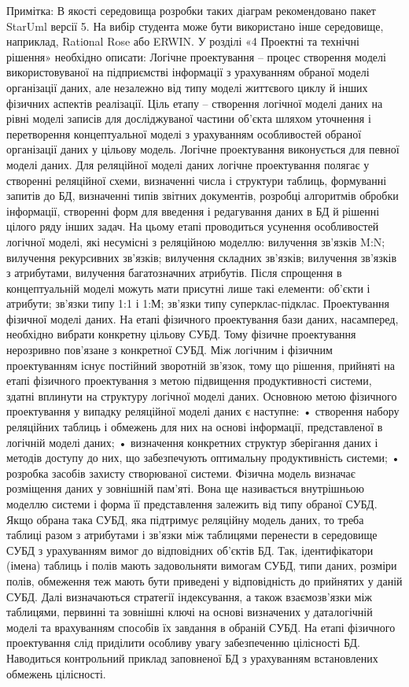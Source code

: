 Примітка: В якості середовища розробки таких діаграм рекомендовано пакет StarUml версії 5. На вибір студента може бути використано інше середовище, наприклад, Ratiоnal Rose або ERWIN.
 	У розділі «4  Проектні та технічні рішення» необхідно описати:
	Логічне проектування – процес створення моделі використовуваної на підприємстві інформації з урахуванням обраної моделі організації даних, але незалежно від типу моделі життєвого циклу й інших фізичних аспектів реалізації. Ціль етапу – створення логічної моделі даних на рівні моделі записів для досліджуваної частини об’єкта  шляхом уточнення і перетворення концептуальної моделі з урахуванням особливостей обраної організації даних у цільову модель. 
Логічне проектування виконується для певної моделі даних. Для реляційної моделі даних логічне проектування полягає у створенні реляційної схеми, визначенні числа і структури таблиць, формуванні запитів до БД, визначенні типів звітних документів, розробці алгоритмів обробки інформації, створенні форм для введення і редагування даних в БД й рішенні цілого ряду інших задач. На цьому етапі проводиться усунення особливостей логічної моделі, які несумісні з реляційною моделлю: вилучення зв’язків M:N; вилучення рекурсивних зв’язків; вилучення складних зв’язків; вилучення зв’язків з атрибутами, вилучення багатозначних атрибутів. Після спрощення в концептуальній моделі можуть мати присутні лише такі елементи: об’єкти і атрибути; зв’язки типу 1:1 і 1:М; зв’язки типу суперклас-підклас.
	Проектування фізичної моделі даних. На етапі фізичного проектування бази даних, насамперед, необхідно вибрати конкретну цільову СУБД. Тому фізичне проектування нерозривно пов'язане з конкретної СУБД. Між логічним і фізичним проектуванням існує постійний зворотній зв'язок, тому що рішення, прийняті на етапі фізичного проектування з метою підвищення продуктивності системи, здатні вплинути на структуру логічної моделі даних. 
	Основною метою фізичного проектування у випадку реляційної моделі даних є наступне: 
	• створення набору реляційних таблиць і обмежень для них на основі інформації, представленої в логічній моделі даних; 
	• визначення конкретних структур зберігання даних і методів доступу до них, що забезпечують оптимальну продуктивність системи; 
	• розробка засобів захисту створюваної системи. 
	Фізична модель визначає розміщення даних у зовнішній пам’яті. Вона ще називається внутрішньою моделлю системи і форма її представлення залежить від типу обраної СУБД. Якщо обрана така СУБД, яка підтримує реляційну модель даних, то треба таблиці разом з атрибутами і зв’язки між таблицями перенести в середовище СУБД з урахуванням вимог до відповідних об’єктів БД. Так, ідентифікатори (імена) таблиць і полів мають задовольняти вимогам СУБД, типи даних, розміри полів, обмеження теж мають бути приведені у відповідність до прийнятих у даній СУБД. Далі визначаються стратегії індексування, а також взаємозв’язки між таблицями, первинні та зовнішні ключі на основі визначених у даталогічній моделі та врахуванням способів їх завдання в обраній СУБД. 	
На етапі фізичного проектування слід приділити особливу увагу забезпеченню цілісності БД. Наводиться контрольний приклад заповненої БД з урахуванням встановлених обмежень цілісності. 	

